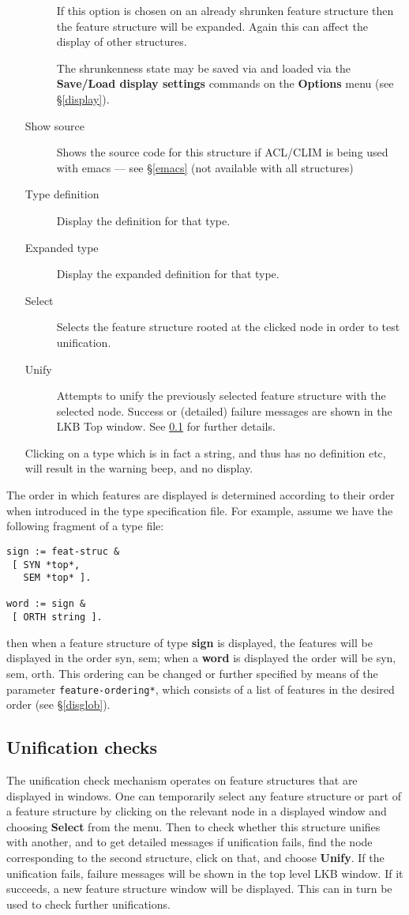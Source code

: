 \documentclass[12pt]{report}
\begin{document}
\begin{enumerate}
\begin{description}
If this option is chosen on an already shrunken feature structure then
the feature structure will be expanded.  Again this can affect the
display of other structures.

The shrunkenness state may be saved via and loaded via the
{\bf Save/Load display settings} commands on the {\bf Options} menu
(see \S\ref{display}).
\item [Show source] Shows the source code for this structure 
if ACL/CLIM is being used with emacs --- see \S\ref{emacs} (not available
with all structures)
\item[Type definition] 
Display the definition for that type.
\item[Expanded type]
Display the expanded definition for that type.
\item[Select]  Selects the
feature structure rooted at the clicked node in order to test unification.
\item[Unify] Attempts to unify the previously selected feature structure
with the selected node.  Success or (detailed) failure messages
are shown in the LKB Top window.  See \ref{unifcheck} for further
details.
\end{description}
Clicking on a type which is in fact a string, and thus has no
definition etc, will result in the warning beep, and no display.
\end{enumerate}

The order in which features are displayed is determined according to
their order when introduced in the type specification file.  For
example, assume we have the following fragment of a type file:
\begin{verbatim}
sign := feat-struc &
 [ SYN *top*, 
   SEM *top* ].

word := sign &
 [ ORTH string ].
\end{verbatim}
then when a feature structure of type {\bf sign} is displayed, the
features will be displayed in the order {\sc syn}, {\sc sem}; when a {\bf
word} is displayed the order will be {\sc syn}, {\sc sem}, {\sc orth}.
This ordering can be changed or further specified by
means of the parameter {\tt *feature-ordering*}, which consists of
a list of features in the desired order (see \S\ref{disglob}).

\subsection{Unification checks}
\label{unifcheck}

The unification check mechanism operates on feature
structures that are displayed in windows.  One can
temporarily select any feature structure or part of a feature structure
by clicking on the relevant node in a displayed window and choosing
{\bf Select} from the menu.  Then to check whether this structure
unifies with another, and to get detailed messages if unification fails,
find the node corresponding to the second
structure, click on that, and choose {\bf Unify}.
If the unification fails, failure messages will be shown in the
top level LKB window.  If it succeeds, a new feature structure
window will be displayed.  This can in turn be used to check further
unifications.
\end{document}
